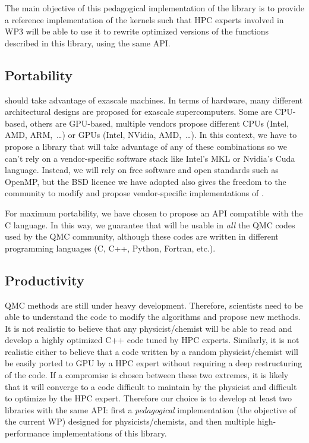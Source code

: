 The main objective of this pedagogical implementation of the library
is to provide a reference implementation of the kernels such that
\ac{HPC} experts involved in \ac{WP}3 will be able to use it to rewrite
optimized versions of the functions described in this library, using the same
\ac{API}.

\subsection{Portability}

\QMCkl{} should take advantage of exascale machines. In terms of hardware,
many different architectural designs are proposed for exascale
supercomputers. Some are CPU-based, others are \ac{GPU}-based, multiple vendors
propose different CPUs (Intel, AMD, ARM,~\dots) or \acp{GPU} (Intel,
NVidia, AMD,~\dots). In this context, we have to propose a library that
will take advantage of any of these combinations so we can't rely on 
a vendor-specific software stack like Intel's \ac{MKL} or Nvidia's
Cuda language. Instead, we
will rely on free software and open standards such as OpenMP, but the BSD
licence we have adopted also gives the freedom to the community to
modify \QMCkl{} and propose vendor-specific implementations of \QMCkl{}.

For maximum portability, we have chosen to propose an \ac{API} compatible with
the C language. In this way, we guarantee that \QMCkl{} will be usable in
\emph{all} the QMC codes used by the \ac{QMC} community, although these codes
are written in different programming languages (C, C++, Python, Fortran, etc.).

\subsection{Productivity}

\ac{QMC} methods are still under heavy development. Therefore,
scientists need to be able to understand the code to modify the
algorithms and propose new methods. It is not realistic to believe
that any physicist/chemist will be able to read and develop a highly optimized
C++ code tuned by \ac{HPC} experts. Similarly, it is not realistic
either to believe that a code written by a random physicist/chemist will
be easily ported to \ac{GPU} by a \ac{HPC} expert without requiring a deep
restructuring of the code. If a compromise
is chosen between these two extremes, it is likely that it will
converge to a code difficult to maintain by the physicist and
difficult to optimize by the \ac{HPC} expert. Therefore our choice is to
develop at least two libraries with the same \ac{API}: first a
\emph{pedagogical} implementation (the objective of the current \ac{WP})
designed for physicists/chemists, and then multiple high-performance
implementations of this library.



